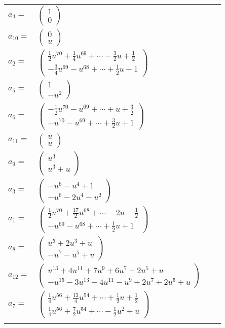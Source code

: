 \documentclass[1p]{elsarticle_modified}
\theoremstyle{definition}
\begin{document}
\begin{tabular}{m{7pt} m{180pt} m{7pt} m{180pt} }
\flushright $a_{4}=$&$\begin{pmatrix}1\\0\end{pmatrix}$ \\
\flushright $a_{10}=$&$\begin{pmatrix}0\\u\end{pmatrix}$ \\
\flushright $a_{2}=$&$\begin{pmatrix}\frac{1}{2} u^{70}+\frac{1}{4} u^{69}+\cdots-\frac{3}{2} u+\frac{1}{2}\\-\frac{3}{4} u^{69}- u^{68}+\cdots+\frac{1}{2} u+1\end{pmatrix}$ \\
\flushright $a_{5}=$&$\begin{pmatrix}1\\- u^2\end{pmatrix}$ \\
\flushright $a_{6}=$&$\begin{pmatrix}-\frac{1}{2} u^{70}- u^{69}+\cdots+u+\frac{3}{2}\\- u^{70}- u^{69}+\cdots+\frac{3}{2} u+1\end{pmatrix}$ \\
\flushright $a_{11}=$&$\begin{pmatrix}u\\u\end{pmatrix}$ \\
\flushright $a_{9}=$&$\begin{pmatrix}u^3\\u^3+u\end{pmatrix}$ \\
\flushright $a_{3}=$&$\begin{pmatrix}- u^6- u^4+1\\- u^6-2 u^4- u^2\end{pmatrix}$ \\
\flushright $a_{1}=$&$\begin{pmatrix}\frac{1}{2} u^{70}+\frac{17}{2} u^{68}+\cdots-2 u-\frac{1}{2}\\- u^{69}- u^{68}+\cdots+\frac{1}{2} u+1\end{pmatrix}$ \\
\flushright $a_{8}=$&$\begin{pmatrix}u^5+2 u^3+u\\- u^7- u^5+u\end{pmatrix}$ \\
\flushright $a_{12}=$&$\begin{pmatrix}u^{13}+4 u^{11}+7 u^9+6 u^7+2 u^5+u\\- u^{15}-3 u^{13}-4 u^{11}- u^9+2 u^7+2 u^5+u\end{pmatrix}$ \\
\flushright $a_{7}=$&$\begin{pmatrix}\frac{1}{4} u^{56}+\frac{13}{4} u^{54}+\cdots+\frac{1}{2} u+\frac{1}{2}\\\frac{1}{4} u^{56}+\frac{7}{2} u^{54}+\cdots-\frac{1}{2} u^2+u\end{pmatrix}$\\&\end{tabular}
\end{document}
